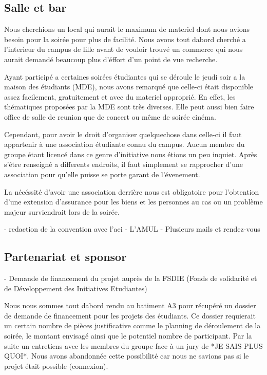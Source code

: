 \subsection{Salle et bar} %
\label{sub:salle_et_bar}

Nous cherchions un local qui aurait le maximum de materiel dont nous
avions besoin pour la soirée pour plus de facilité. Nous avons tout
dabord cherché a l'interieur du campus de lille avant de vouloir trouvé
un commerce qui nous aurait demandé beaucoup plus d'éffort d'un point de
vue recherche.

Ayant participé a certaines soirées étudiantes qui se déroule le jeudi
soir a la maison des étudiants (MDE), nous avons remarqué que celle-ci
était disponible assez facilement, gratuitement et avec du materiel
approprié. En effet, les thématiques proposées par la MDE sont très
diverses. Elle peut aussi bien faire office de salle de reunion que de
concert ou même de soirée cinéma.

Cependant, pour avoir le droit d'organiser quelquechose dans celle-ci il
faut appartenir à une association étudiante connu du campus. Aucun
membre du groupe étant licencé dans ce genre d'initiative nous étions un
peu inquiet. Après s'être renseigné a differents endroits, il faut
simplement se rapprocher d'une association pour qu'elle puisse se porte
garant de l'évenement.

La nécéssité d'avoir une association derrière nous est obligatoire pour
l'obtention d'une extension d'assurance pour les biens et les personnes
au cas ou un problème majeur surviendrait lors de la soirée.

- redaction de la convention avec l'aei
- L'AMUL
- Plusieurs mails et rendez-vous

\subsection{Partenariat et sponsor} %
\label{sub:partenariat_et_sponsor}

- Demande de financement du projet auprès de la FSDIE (Fonds de solidarité 
  et de Développement des Initiatives Etudiantes)

  Nous nous sommes tout dabord rendu au batiment A3
  pour récupéré un dossier de demande de financement pour les projets des
  étudiants. Ce dossier requierait un certain nombre de pièces
  justificative comme le planning de déroulement de la soirée, le montant
  envisagé ainsi que le potentiel nombre de participant. Par la suite un
  entretiens avec les membres du groupe face à un jury de *JE SAIS
  PLUS QUOI*. Nous avons abandonnée cette possibilité car nous ne savions
  pas si le projet était possible (connexion).

